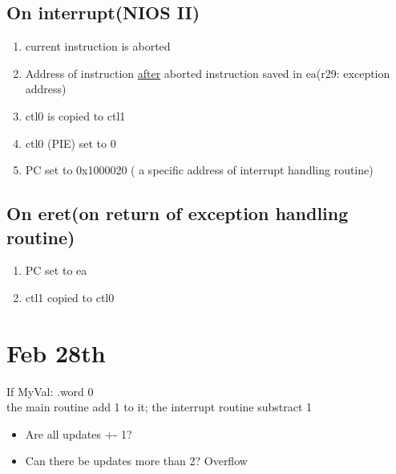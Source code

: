 \documentclass[11pt]{article}
\begin{document}
\subsection{On interrupt(NIOS II)}
\label{sec:orgheadline74}
\begin{enumerate}
\item current instruction is aborted
\item Address of instruction \uline{after} aborted instruction saved in ea(r29: exception address)
\item ctl0 is copied to ctl1
\item ctl0 (PIE) set to 0
\item PC set to 0x1000020 ( a specific address of interrupt handling routine)
\end{enumerate}
\subsection{On eret(on return of exception handling routine)}
\label{sec:orgheadline75}
\begin{enumerate}
\item PC set to ea
\item ctl1 copied to ctl0
\end{enumerate}
\section{Feb 28th}
\label{sec:orgheadline77}
If MyVal: .word 0 \\
the main routine add 1 to it; the interrupt routine substract 1 \\
\begin{itemize}
\item Are all updates +- 1?
\item Can there be updates more than 2? Overflow
\end{itemize}
\end{document}
